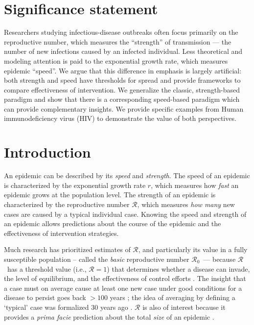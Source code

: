 \documentclass[12pt]{article}
\newcommand{\Rx}[1]{\ensuremath{{\mathcal R}_{#1}}}
\newcommand{\Ro}{\Rx{0}}
\newcommand{\RR}{\ensuremath{{\mathcal R}}}
\begin{document}
\section*{Significance statement}

Researchers studying infectious-disease outbreaks often focus primarily on the reproductive number, which measures the ``strength'' of transmission --- the number of new infections caused by an infected individual.
Less theoretical and modeling attention is paid to the exponential growth rate, which measures epidemic ``speed''. 
We argue that this difference in emphasis is largely artificial: both strength and speed have thresholds for spread and provide frameworks to compare effectiveness of intervention.
We generalize the classic, strength-based paradigm and show that there is a corresponding speed-based paradigm which can provide complementary insights.
We provide specific examples from Human immunodeficiency virus (HIV) to demonstrate the value of both perspectives.

\pagebreak

\section{Introduction}

An epidemic can be described by its \emph{speed} and \emph{strength}.
The speed of an epidemic is characterized by the exponential growth rate $r$, which measures how \emph{fast} an epidemic grows at the population level.
The strength of an epidemic is characterized by the reproductive number \RR, which measures \emph{how many} new cases are caused by a typical individual case.
Knowing the speed and strength of an epidemic allows predictions about the course of the epidemic and the effectiveness of intervention strategies.

Much research has prioritized estimates of \RR, and particularly its value in a fully susceptible population -- called the \emph{basic} reproductive number \Ro\, --- because \RR\ has a threshold value (i.e., $\RR=1$) that determines whether a disease can invade, the level of equilibrium, and the effectiveness of control efforts \citep{anderson1991infectious, diekmann1990definition}.
The insight that a case must on average cause at least one new case under good conditions for a disease to persist goes back $>100$ years \citep{ross1911prevention};
the idea of averaging by defining a `typical' case was formalized 30 years ago \citep{diekmann1990definition}.
$\RR$ is also of interest because it provides a \emph{prima facie} prediction about the total \emph{size} of an epidemic \citep{anderson1991infectious, ma2006generality, arino2007final, andreasen2011final, miller2012note}.
\end{document}
